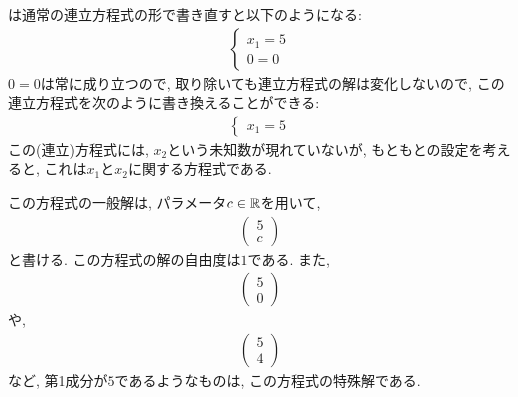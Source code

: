 \begin{example}
  は通常の連立方程式の形で書き直すと以下のようになる:
  \begin{align*}
    \begin{cases}
      x_1=5\\
      0=0
    \end{cases}
  \end{align*}
  $0=0$は常に成り立つので, 取り除いても連立方程式の解は変化しないので,
  この連立方程式を次のように書き換えることができる:
  \begin{align*}
    \begin{cases}
      x_1=5
    \end{cases}
  \end{align*}
  この(連立)方程式には, $x_2$という未知数が現れていないが,
  もともとの設定を考えると, これは$x_1$と$x_2$に関する方程式である.

  この方程式の一般解は,
  パラメータ$c\in\mathbb{R}$を用いて,
  \begin{align*}
    \begin{pmatrix}5\\c\end{pmatrix}
  \end{align*}
  と書ける.
  この方程式の解の自由度は$1$である.
  また, 
  \begin{align*}
    \begin{pmatrix}5\\0\end{pmatrix}
  \end{align*}
  や,
  \begin{align*}
    \begin{pmatrix}5\\4\end{pmatrix}
  \end{align*}
  など, 第1成分が$5$であるようなものは,
  この方程式の特殊解である.
\end{example}


